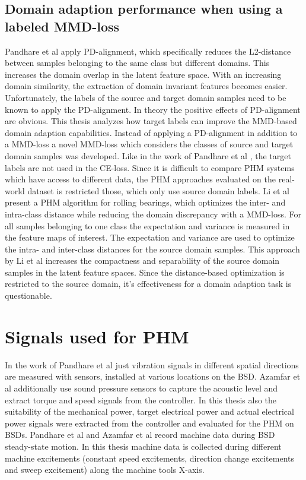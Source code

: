 \subsection{Domain adaption performance when using a labeled MMD-loss}
Pandhare et al \cite{Pandhare2021} apply PD-alignment, which specifically reduces the L2-distance between samples belonging to the same class but different domains. This increases the domain overlap in the latent feature space. With an increasing domain similarity, the extraction of domain invariant features becomes easier. Unfortunately, the labels of the source and target domain samples need to be known to apply the PD-alignment. In theory the positive effects of PD-alignment are obvious. This thesis analyzes how target labels can improve the MMD-based domain adaption capabilities. Instead of applying a PD-alignment in addition to a MMD-loss a novel MMD-loss which considers the classes of source and target domain samples was developed. Like in the work of Pandhare et al \cite{Pandhare2021}, the target labels are not used in the CE-loss. Since it is difficult to compare PHM systems which have access to different data, the PHM approaches evaluated on the real-world dataset is restricted those, which only use source domain labels. Li et al \cite{Li2018} present a PHM algorithm for rolling bearings, which optimizes the inter- and intra-class distance while reducing the domain discrepancy with a MMD-loss. For all samples belonging to one class the expectation and variance is measured in the feature maps of interest. The expectation and variance are used to optimize the intra- and inter-class distances for the source domain samples. This approach by Li et al increases the compactness and separability of the source domain samples in the latent feature spaces. Since the distance-based optimization is restricted to the source domain, it's effectiveness for a domain adaption task is questionable.

\section{Signals used for PHM}
In the work of Pandhare et al \cite{Pandhare2021} just vibration signals in different spatial directions are measured with sensors, installed at various locations on the BSD. Azamfar et al \cite{AZAMFAR2020103932} additionally use sound pressure sensors to capture the acoustic level and extract torque and speed signals from the controller. In this thesis also the suitability of the mechanical power, target electrical power and actual electrical power signals were extracted from the controller and evaluated for the PHM on BSDs. Pandhare et al and Azamfar et al record machine data during BSD steady-state motion. In this thesis machine data is collected during different machine excitements (constant speed excitements, direction change excitements and sweep excitement) along the machine tools X-axis.

